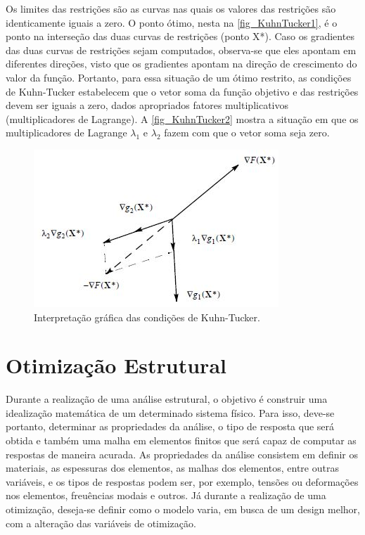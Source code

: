 Os limites das restrições são as curvas nas quais os valores das restrições são identicamente iguais a zero. O ponto ótimo, nesta na \autoref{fig_KuhnTucker1}, é o ponto na interseção das duas curvas de restrições (ponto X*). Caso os gradientes das duas curvas de restrições sejam computados, observa-se que eles apontam em diferentes direções, visto que os gradientes apontam na direção de crescimento do valor da função. Portanto, para essa situação de um ótimo restrito, as condições de Kuhn-Tucker estabelecem que o vetor soma da função objetivo e das restrições devem ser iguais a zero, dados apropriados fatores multiplicativos (multiplicadores de Lagrange). A \autoref{fig_KuhnTucker2} mostra a situação em que os multiplicadores de Lagrange $\lambda_1$ e $\lambda_2$ fazem com que o vetor soma seja zero.

\begin{figure}[h]
	\caption{\label{fig_KuhnTucker2}Interpretação gráfica das condições de Kuhn-Tucker.}
  \centering
  \includegraphics[scale=1.0]{figura/KuhnTucker2}
\end{figure}

\section{Otimização Estrutural}
Durante a realização de uma análise estrutural, o objetivo é construir uma idealização matemática de um determinado sistema físico. Para isso, deve-se portanto, determinar as propriedades da análise, o tipo de resposta que será obtida e também uma malha em elementos finitos que será capaz de computar as respostas de maneira acurada. As propriedades da análise consistem em definir os materiais, as espessuras dos elementos, as malhas dos elementos, entre outras variáveis, e os tipos de respostas podem ser, por exemplo, tensões ou deformações nos elementos, freuências modais e outros. Já durante a realização de uma otimização, deseja-se definir como o modelo varia, em busca de um design melhor, com a alteração das variáveis de otimização.

